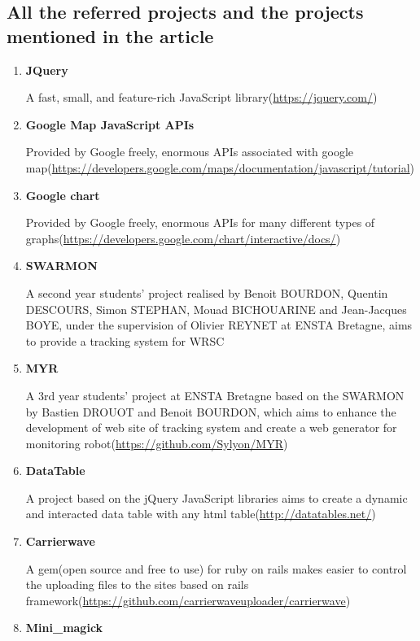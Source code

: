\subsection{All the referred projects and the projects mentioned in the article}
\begin{enumerate}
\item{\textbf{JQuery}}

A fast, small, and feature-rich JavaScript library(\url{https://jquery.com/})

\item{\textbf{Google Map JavaScript APIs}}

Provided by Google freely, enormous APIs associated with google map(\url{https://developers.google.com/maps/documentation/javascript/tutorial}) 

\item{\textbf{Google chart}}

Provided by Google freely, enormous APIs for many different types of graphs(\url{https://developers.google.com/chart/interactive/docs/})

\item{\textbf{SWARMON}}

A second year students' project realised by Benoit BOURDON, Quentin DESCOURS, Simon STEPHAN, Mouad BICHOUARINE and Jean-Jacques BOYE, under the supervision of Olivier REYNET at ENSTA Bretagne, aims to provide a tracking system for WRSC

\item{\textbf{MYR}}

A 3rd year students' project at ENSTA Bretagne based on the SWARMON by Bastien DROUOT and Benoit BOURDON, which aims to enhance the development of web site of tracking system and create a web generator for monitoring robot(\url{https://github.com/Sylyon/MYR})

\item{\textbf{DataTable}}

A project based on the jQuery JavaScript libraries aims to create a dynamic and interacted data table with any html table(\url{http://datatables.net/})

\item{\textbf{Carrierwave}}

A gem(open source and free to use) for ruby on rails makes easier to control the uploading files to the sites based on rails framework(\url{https://github.com/carrierwaveuploader/carrierwave})

\item{\textbf{Mini\_magick}}


\end{enumerate}
